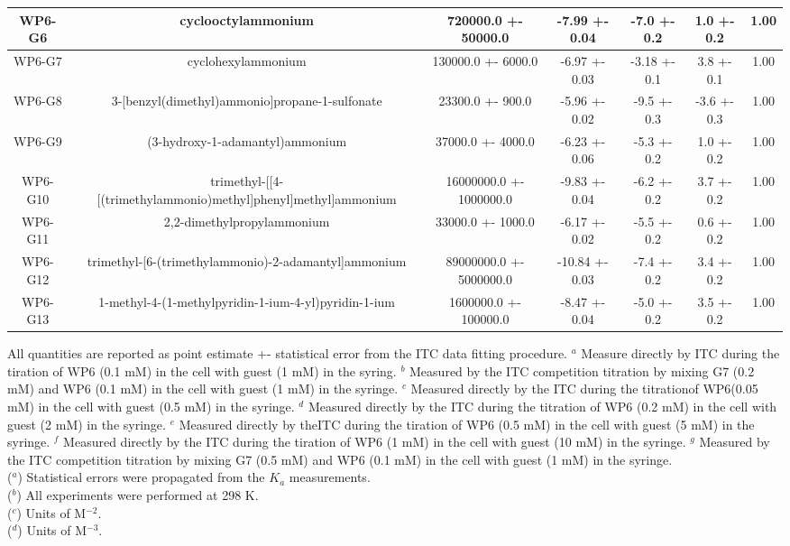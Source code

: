 \documentclass{article}
\begin{document}
\begin{center}
\begin{tabu}{| c | c | c | c | c | c | c |}
\hline
WP6-G6 & cyclooctylammonium & 720000.0 +- 50000.0 & -7.99 +- 0.04 & -7.0 +- 0.2 & 1.0 +- 0.2 &  1.00 \\
\hline
WP6-G7 & cyclohexylammonium & 130000.0 +- 6000.0 & -6.97 +- 0.03 & -3.18 +- 0.1 & 3.8 +- 0.1 &  1.00 \\
\hline
WP6-G8 & 3-[benzyl(dimethyl)ammonio]propane-1-sulfonate & 23300.0 +- 900.0 & -5.96 +- 0.02 & -9.5 +- 0.3 & -3.6 +- 0.3 &  1.00 \\
\hline
WP6-G9 & (3-hydroxy-1-adamantyl)ammonium & 37000.0 +- 4000.0 & -6.23 +- 0.06 & -5.3 +- 0.2 & 1.0 +- 0.2 &  1.00 \\
\hline
WP6-G10 & trimethyl-[[4-[(trimethylammonio)methyl]phenyl]methyl]ammonium & 16000000.0 +- 1000000.0 & -9.83 +- 0.04 & -6.2 +- 0.2 & 3.7 +- 0.2 &  1.00 \\
\hline
WP6-G11 & 2,2-dimethylpropylammonium & 33000.0 +- 1000.0 & -6.17 +- 0.02 & -5.5 +- 0.2 & 0.6 +- 0.2 &  1.00 \\
\hline
WP6-G12 & trimethyl-[6-(trimethylammonio)-2-adamantyl]ammonium & 89000000.0 +- 5000000.0 & -10.84 +- 0.03 & -7.4 +- 0.2 & 3.4 +- 0.2 &  1.00 \\
\hline
WP6-G13 & 1-methyl-4-(1-methylpyridin-1-ium-4-yl)pyridin-1-ium & 1600000.0 +- 100000.0 & -8.47 +- 0.04 & -5.0 +- 0.2 & 3.5 +- 0.2 &  1.00 \\
\hline
\end{tabu}\end{center}\vspace{5mm}
All quantities are reported as point estimate +- statistical error from the ITC data fitting procedure. $^a$ Measure directly by ITC during the tiration of WP6 (0.1 mM) in the cell with guest (1 mM) in the syring. $^b$ Measured by the ITC competition titration by mixing G7 (0.2 mM) and WP6 (0.1 mM) in the cell with guest (1 mM) in the syringe. $^c$ Measured directly by the ITC during the titrationof WP6(0.05 mM) in the cell with guest (0.5 mM) in the syringe. $^d$ Measured directly by the ITC during the titration of WP6 (0.2 mM) in the cell with guest (2 mM) in the syringe. $^e$ Measured directly by theITC during the tiration of WP6 (0.5 mM) in the cell with guest (5 mM) in the syringe. $^f$ Measured directly by the ITC during the tiration of WP6 (1 mM) in the cell with guest (10 mM) in the syringe. $^g$ Measured by the ITC competition titration by mixing G7 (0.5 mM) and WP6 (0.1 mM) in the cell with guest (1 mM) in the syringe.\\
($^a$) Statistical errors were propagated from the $K_a$ measurements. \\
($^b$) All experiments were performed at 298 K. \\
($^c$) Units of M$^{-2}$. \\
($^d$) Units of M$^{-3}$.
\end{document}
